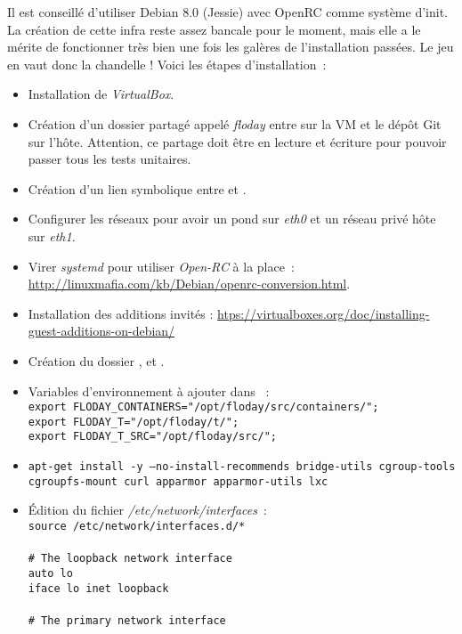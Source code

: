 Il est conseillé d'utiliser Debian 8.0 (Jessie) avec OpenRC comme système d'init.
La création de cette infra reste assez bancale pour le moment, mais elle a le mérite de fonctionner très bien une fois les galères de l'installation passées.
Le jeu en vaut donc la chandelle !
Voici les étapes d'installation~:
\begin{itemize}
	\item Installation de \emph{VirtualBox}.
	\item Création d'un dossier partagé appelé \emph{floday} entre  sur la VM et le dépôt Git sur l'hôte. Attention, ce partage doit être en lecture et écriture pour pouvoir passer tous les tests unitaires.
	\item Création d'un lien symbolique entre  et .
	\item Configurer les réseaux pour avoir un pond sur \emph{eth0} et un réseau privé hôte sur \emph{eth1}.
	\item Virer \emph{systemd} pour utiliser \emph{Open-RC} à la place~: \url{http://linuxmafia.com/kb/Debian/openrc-conversion.html}.
	\item Installation des additions invités : \url{htps://virtualboxes.org/doc/installing-guest-additions-on-debian/}
	\item Création du dossier ,  et .
	\item Variables d'environnement à ajouter dans ~:\\
{\tt export FLODAY\_CONTAINERS="/opt/floday/src/containers/";\\
export FLODAY\_T="/opt/floday/t/";\\
export FLODAY\_T\_SRC="/opt/floday/src/";}
	\item {\tt{}apt-get install -y --no-install-recommends bridge-utils cgroup-tools\\
		cgroupfs-mount curl apparmor apparmor-utils lxc}
	\item Édition du fichier \emph{/etc/network/interfaces}~:\\
		{\tt{}source /etc/network/interfaces.d/*\\
\\
\# The loopback network interface\\
auto lo\\
iface lo inet loopback\\
\\
\# The primary network interface\\
}
\end{itemize}
